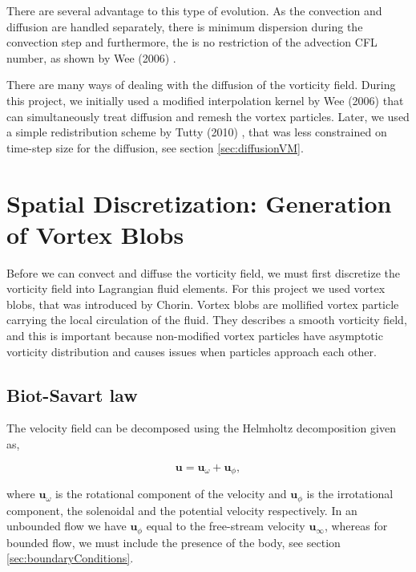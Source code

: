 There are several advantage to this type of evolution. As the convection and diffusion are handled separately, there is minimum dispersion during the convection step and furthermore, the is no restriction of the advection CFL number, as shown by Wee (2006) \cite{Wee2006}.

There are many ways of dealing with the diffusion of the vorticity field. During this project, we initially used a modified interpolation kernel by Wee (2006) \cite{Wee2006} that can simultaneously treat diffusion and remesh the vortex particles. Later, we used a simple redistribution scheme by Tutty (2010) \cite{2010arXiv1009.0166T}, that was less constrained on time-step size for the diffusion, see section \ref{sec:diffusionVM}.

\section{Spatial Discretization: Generation of Vortex Blobs}
\label{sec:spatialDiscretization}

Before we can convect and diffuse the vorticity field, we must first discretize the vorticity field into Lagrangian fluid elements. For this project we used vortex blobs, that was introduced by Chorin. Vortex blobs are mollified vortex particle carrying the local circulation of the fluid. They describes a smooth vorticity field, and this is important because non-modified vortex particles have asymptotic vorticity distribution and causes issues when particles approach each other.

\subsection{Biot-Savart law}

The velocity field can be decomposed using the Helmholtz decomposition given as,

	\begin{equation}
	\mathbf{u} = \mathbf{u}_{\omega} + \mathbf{u}_{\phi},
	\label{eq:helmholtz}
	\end{equation}

where $\mathbf{u}_{\omega}$ is the rotational component of the velocity and $\mathbf{u}_{\phi}$ is the irrotational component, the solenoidal and the potential velocity respectively. In an unbounded flow we have $\mathbf{u}_{\phi}$ equal to the free-stream velocity $\mathbf{u}_{\infty}$, whereas for bounded flow, we must include the presence of the body, see section \ref{sec:boundaryConditions}.
	
